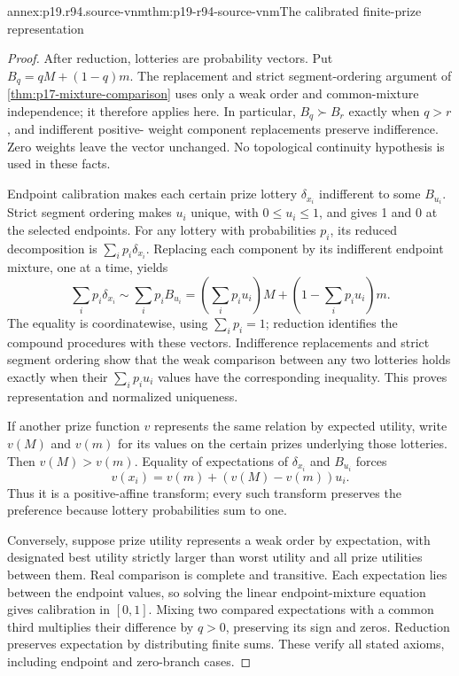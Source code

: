 \begin{annexitem}{annex:p19.r94.source-vnm}{thm:p19-r94-source-vnm}{The calibrated finite-prize representation}
\begin{proof}
After reduction, lotteries are probability vectors. Put
\(B_q=qM+(1-q)m\). The replacement and strict segment-ordering
argument of \cref{thm:p17-mixture-comparison} uses only a weak order
and common-mixture independence; it therefore applies here. In particular,
\(B_q\succ B_r\) exactly when \(q>r\), and indifferent positive-
weight component replacements preserve indifference. Zero weights leave
the vector unchanged. No topological continuity hypothesis is used in
these facts.

Endpoint calibration makes each certain prize lottery \(\delta_{x_i}\)
indifferent to some \(B_{u_i}\). Strict segment ordering makes \(u_i\)
unique, with \(0\leq u_i\leq1\), and gives 1 and 0 at the selected
endpoints. For any lottery with probabilities \(p_i\), its reduced
decomposition is \(\sum_i p_i\delta_{x_i}\). Replacing each component
by its indifferent endpoint mixture, one at a time, yields
\[
 \sum_i p_i\delta_{x_i}\sim\sum_i p_i B_{u_i}
   =\left(\sum_i p_i u_i\right)M+
                  \left(1-\sum_i p_i u_i\right)m.
\]
The equality is coordinatewise, using \(\sum_i p_i=1\); reduction
identifies the compound procedures with these vectors. Indifference
replacements and strict segment ordering show that the weak comparison
between any two lotteries holds exactly when their \(\sum_i p_i u_i\)
values have the corresponding inequality. This proves representation and
normalized uniqueness.

If another prize function \(v\) represents the same relation by expected
utility, write \(v(M)\) and \(v(m)\) for its values on the certain
prizes underlying those lotteries. Then \(v(M)>v(m)\). Equality of expectations of
\(\delta_{x_i}\) and \(B_{u_i}\) forces
\[
             v(x_i)=v(m)+(v(M)-v(m))u_i.
\]
Thus it is a positive-affine transform; every such transform preserves
the preference because lottery probabilities sum to one.

Conversely, suppose prize utility represents a weak order by expectation,
with designated best utility strictly larger than worst utility and all
prize utilities between them. Real comparison is complete and transitive.
Each expectation lies between the endpoint values, so solving the linear
endpoint-mixture equation gives calibration in \([0,1]\). Mixing two
compared expectations with a common third multiplies their difference by
\(q>0\), preserving its sign and zeros. Reduction preserves expectation
by distributing finite sums. These verify all stated axioms, including
endpoint and zero-branch cases.
\end{proof}
\end{annexitem}


